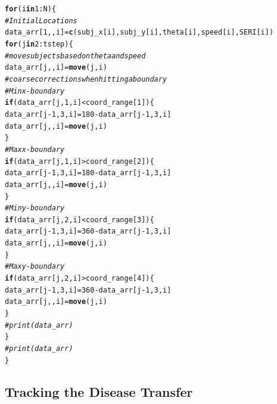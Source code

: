 \documentclass{article}\usepackage[]{graphicx}\usepackage[]{color}
\makeatletter
\newcommand{\hlnum}[1]{\textcolor[rgb]{0.686,0.059,0.569}{#1}}%
\newcommand{\hlcom}[1]{\textcolor[rgb]{0.678,0.584,0.686}{\textit{#1}}}%
\newcommand{\hlopt}[1]{\textcolor[rgb]{0,0,0}{#1}}%
\newcommand{\hlstd}[1]{\textcolor[rgb]{0.345,0.345,0.345}{#1}}%
\newcommand{\hlkwa}[1]{\textcolor[rgb]{0.161,0.373,0.58}{\textbf{#1}}}%
\newcommand{\hlkwb}[1]{\textcolor[rgb]{0.69,0.353,0.396}{#1}}%
\newcommand{\hlkwd}[1]{\textcolor[rgb]{0.737,0.353,0.396}{\textbf{#1}}}%
\newenvironment{kframe}{%
 \def\at@end@of@kframe{}%
 \ifinner\ifhmode%
  \def\at@end@of@kframe{\end{minipage}}%
  \begin{minipage}{\columnwidth}%
 \fi\fi%
 \def\FrameCommand##1{\hskip\@totalleftmargin \hskip-\fboxsep
 \colorbox{shadecolor}{##1}\hskip-\fboxsep
     \hskip-\linewidth \hskip-\@totalleftmargin \hskip\columnwidth}%
 \MakeFramed {\advance\hsize-\width
   \@totalleftmargin\z@ \linewidth\hsize
   \@setminipage}}%
 {\par\unskip\endMakeFramed%
 \at@end@of@kframe}
\newenvironment{knitrout}{}{} %
\makeatother
\begin{document}
\begin{knitrout}
\begin{kframe}
\begin{alltt}
\hlkwa{for}\hlstd{(i} \hlkwa{in} \hlnum{1}\hlopt{:}\hlstd{N)\{}
  \hlcom{# Initial Locations}
  \hlstd{data_arr[}\hlnum{1}\hlstd{,,i]} \hlkwb{=} \hlkwd{c}\hlstd{(subj_x[i], subj_y[i], theta[i], speed[i], SERI[i])}
  \hlkwa{for}\hlstd{(j} \hlkwa{in} \hlnum{2}\hlopt{:}\hlstd{tstep)\{}
    \hlcom{# move subjects based on theta and speed}
    \hlstd{data_arr[j,,i]} \hlkwb{=} \hlkwd{move}\hlstd{(j, i)}
    \hlcom{# coarse corrections when hitting a boundary}
    \hlcom{# Min x-boundary}
    \hlkwa{if}\hlstd{(data_arr[j,}\hlnum{1}\hlstd{,i]} \hlopt{<} \hlstd{coord_range[}\hlnum{1}\hlstd{])\{}
      \hlstd{data_arr[j}\hlopt{-}\hlnum{1}\hlstd{,}\hlnum{3}\hlstd{,i]}\hlkwb{=}\hlnum{180}\hlopt{-}\hlstd{data_arr[j}\hlopt{-}\hlnum{1}\hlstd{,}\hlnum{3}\hlstd{,i]}
      \hlstd{data_arr[j,,i]} \hlkwb{=} \hlkwd{move}\hlstd{(j,i)}
    \hlstd{\}}
    \hlcom{#Max x-boundary}
    \hlkwa{if}\hlstd{(data_arr[j,}\hlnum{1}\hlstd{,i]} \hlopt{>} \hlstd{coord_range[}\hlnum{2}\hlstd{])\{}
      \hlstd{data_arr[j}\hlopt{-}\hlnum{1}\hlstd{,}\hlnum{3}\hlstd{,i]}\hlkwb{=}\hlnum{180}\hlopt{-}\hlstd{data_arr[j}\hlopt{-}\hlnum{1}\hlstd{,}\hlnum{3}\hlstd{,i]}
      \hlstd{data_arr[j,,i]} \hlkwb{=} \hlkwd{move}\hlstd{(j,i)}
    \hlstd{\}}
    \hlcom{#Min y-boundary}
    \hlkwa{if}\hlstd{(data_arr[j,}\hlnum{2}\hlstd{,i]} \hlopt{<} \hlstd{coord_range[}\hlnum{3}\hlstd{])\{}
      \hlstd{data_arr[j}\hlopt{-}\hlnum{1}\hlstd{,}\hlnum{3}\hlstd{,i]}\hlkwb{=}\hlnum{360}\hlopt{-}\hlstd{data_arr[j}\hlopt{-}\hlnum{1}\hlstd{,}\hlnum{3}\hlstd{,i]}
      \hlstd{data_arr[j,,i]} \hlkwb{=} \hlkwd{move}\hlstd{(j,i)}
    \hlstd{\}}
    \hlcom{#Max y-boundary}
    \hlkwa{if}\hlstd{(data_arr[j,}\hlnum{2}\hlstd{,i]} \hlopt{>} \hlstd{coord_range[}\hlnum{4}\hlstd{])\{}
      \hlstd{data_arr[j}\hlopt{-}\hlnum{1}\hlstd{,}\hlnum{3}\hlstd{,i]}\hlkwb{=}\hlnum{360}\hlopt{-}\hlstd{data_arr[j}\hlopt{-}\hlnum{1}\hlstd{,}\hlnum{3}\hlstd{,i]}
      \hlstd{data_arr[j,,i]} \hlkwb{=} \hlkwd{move}\hlstd{(j,i)}
    \hlstd{\}}
   \hlcom{# print(data_arr)}
  \hlstd{\}}
  \hlcom{#print(data_arr)}
\hlstd{\}}
\end{alltt}
\end{kframe}
\end{knitrout}
\subsection{Tracking the Disease Transfer}
\end{document}
